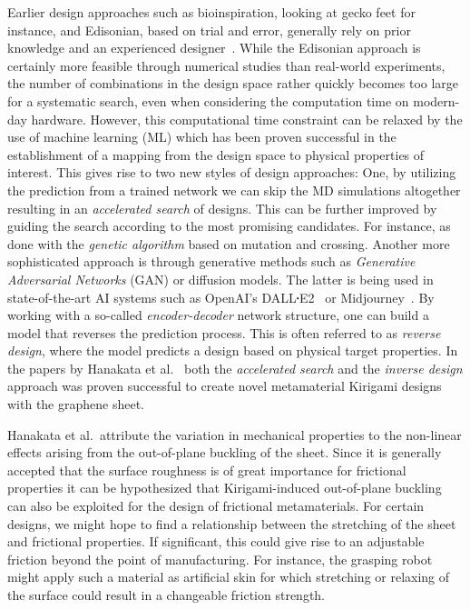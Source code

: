 Earlier design approaches such as bioinspiration, looking at gecko
feet for instance, and Edisonian, based on trial and error, generally rely on
prior knowledge and an experienced designer~\cite{Mao}. While the Edisonian approach is certainly more feasible through numerical studies than real-world
experiments, the number of combinations in the design space rather quickly
becomes too large for a systematic search, even when considering the computation
time on modern-day hardware. However, this computational time constraint can be
relaxed by the use of machine learning (\acrshort{ML}) which has been proven 
successful in the establishment of a mapping from the design space to physical
properties of interest. This gives rise to two new styles of design approaches:
One, by utilizing the prediction from a trained network we can skip the
\acrshort{MD} simulations altogether resulting in an \textit{accelerated search}
of designs. This can be further improved by guiding the search according to
the most promising candidates. For instance, as done with the \textit{genetic
algorithm} based on mutation and crossing. Another
more sophisticated approach is through generative methods such as
\textit{Generative Adversarial Networks} (\acrshort{GAN}) or diffusion models.
The latter is being used in state-of-the-art AI systems such as OpenAI's
DALL$\sq$E2~\cite{DALLE} or Midjourney~\cite{Midjourney}. By working with a
so-called \textit{encoder-decoder} network structure, one can build a model that
reverses the prediction process. This is often referred to as \textit{reverse
design}, where the model predicts a design based on physical target
properties. In the papers by Hanakata et al.~\cite{PhysRevLett.121.255304,
PhysRevResearch.2.042006} both the \textit{accelerated search} and the
\textit{inverse design} approach was proven successful to create novel
metamaterial Kirigami designs with the graphene sheet. 

Hanakata et al.\ attribute the variation in mechanical properties to the
non-linear effects arising from the out-of-plane buckling of the sheet. Since it
is generally accepted that the surface roughness is of great importance for
frictional properties it can be hypothesized that Kirigami-induced out-of-plane
buckling can also be exploited for the design of frictional metamaterials. For
certain designs, we might hope to find a relationship between the stretching of
the sheet and frictional properties. If significant, this could give rise to an
adjustable friction beyond the point of manufacturing. For instance,
the grasping robot might apply such a material as artificial skin for which
stretching or relaxing of the surface could result in a changeable friction
strength.

